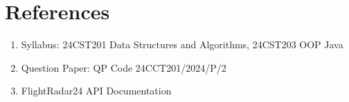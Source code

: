 \documentclass[12pt,a4paper]{article}
\begin{document}
\section{References}

\begin{enumerate}
    \item Syllabus: 24CST201 Data Structures and Algorithms, 24CST203 OOP Java
    \item Question Paper: QP Code 24CCT201/2024/P/2
    \item FlightRadar24 API Documentation
\end{enumerate}
\end{document}
